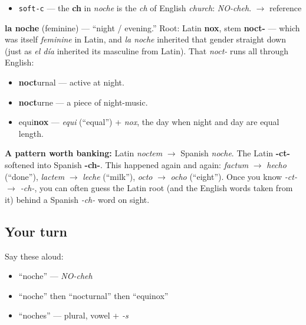\begin{sounds}
\begin{itemize}
\raggedright
  \item \texttt{soft-c} — the \textbf{ch} in \emph{noche} is the \emph{ch} of English \emph{church}: \emph{NO-cheh}. $\to$ reference
\end{itemize}
\end{sounds}

\begin{cousinweb}
\textbf{la noche} (feminine) — \textquotedblleft{}night / evening.\textquotedblright{} Root: Latin \textbf{nox}, stem \textbf{noct-} — which was itself \emph{feminine} in Latin, and \emph{la noche} inherited that gender straight down (just as \emph{el día} inherited its masculine from Latin). That \emph{noct-} runs all through English:

\begin{itemize}
\raggedright
  \item \textbf{noct}urnal — active at night.
  \item \textbf{noct}urne — a piece of night-music.
  \item equi\textbf{nox} — \emph{equi} (\textquotedblleft{}equal\textquotedblright{}) + \emph{nox}, the day when night and day are equal length.
\end{itemize}

\textbf{A pattern worth banking:} Latin \emph{noctem} $\to$ Spanish \emph{noche}. The Latin \textbf{-ct-} softened into Spanish \textbf{-ch-}. This happened again and again: \emph{factum} $\to$ \emph{hecho} (\textquotedblleft{}done\textquotedblright{}), \emph{lactem} $\to$ \emph{leche} (\textquotedblleft{}milk\textquotedblright{}), \emph{octo} $\to$ \emph{ocho} (\textquotedblleft{}eight\textquotedblright{}). Once you know \emph{-ct- $\to$ -ch-}, you can often guess the Latin root (and the English words taken from it) behind a Spanish \emph{-ch-} word on sight.
\end{cousinweb}

\subsection*{Your turn}
Say these aloud:

\begin{itemize}
\raggedright
  \item \textquotedblleft{}noche\textquotedblright{} — \emph{NO-cheh}
  \item \textquotedblleft{}noche\textquotedblright{} then \textquotedblleft{}nocturnal\textquotedblright{} then \textquotedblleft{}equinox\textquotedblright{}
  \item \textquotedblleft{}noches\textquotedblright{} — plural, vowel + \emph{-s}
\end{itemize}

